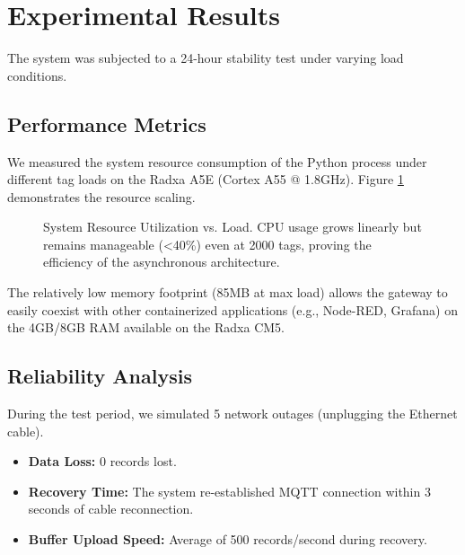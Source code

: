 \documentclass[journal]{IEEEtran}
\begin{document}
\section{Experimental Results}
The system was subjected to a 24-hour stability test under varying load conditions.

\subsection{Performance Metrics}
We measured the system resource consumption of the Python process under different tag loads on the Radxa A5E (Cortex A55 @ 1.8GHz). Figure \ref{fig:cpu_usage} demonstrates the resource scaling.

\begin{figure}[htbp]
\centering
{}
\caption{System Resource Utilization vs. Load. CPU usage grows linearly but remains manageable (<40\%) even at 2000 tags, proving the efficiency of the asynchronous architecture.}
\label{fig:cpu_usage}
\end{figure}

The relatively low memory footprint (85MB at max load) allows the gateway to easily coexist with other containerized applications (e.g., Node-RED, Grafana) on the 4GB/8GB RAM available on the Radxa CM5.

\subsection{Reliability Analysis}
During the test period, we simulated 5 network outages (unplugging the Ethernet cable).
\begin{itemize}
    \item \textbf{Data Loss:} 0 records lost.
    \item \textbf{Recovery Time:} The system re-established MQTT connection within 3 seconds of cable reconnection.
    \item \textbf{Buffer Upload Speed:} Average of 500 records/second during recovery.
\end{itemize}
\end{document}

